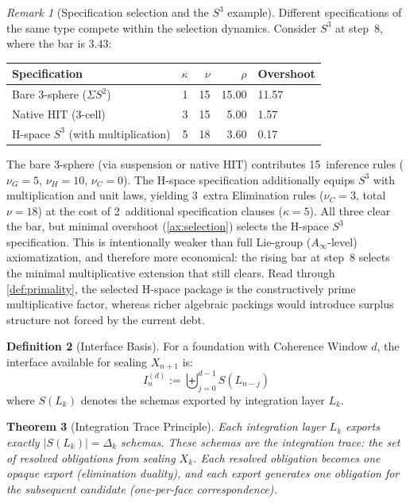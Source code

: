 \documentclass[11pt,a4paper]{article}
\theoremstyle{plain}
\newtheorem{theorem}{Theorem}[section]
\theoremstyle{definition}
\newtheorem{definition}[theorem]{Definition}
\theoremstyle{remark}
\newtheorem{remark}[theorem]{Remark}
\begin{document}
\begin{remark}[Specification selection and the $S^3$ example]
\label{rem:kolmogorov-ambiguity}
Different specifications of the same type compete within the selection dynamics.
Consider $S^3$ at step~8, where the bar is $3.43$:
\begin{center}
\small
\begin{tabular}{@{}lrrrl@{}}
\toprule
Specification & $\kappa$ & $\nu$ & $\rho$ & Overshoot \\
\midrule
Bare 3-sphere ($\Sigma S^2$) & 1 & 15 & 15.00 & 11.57 \\
Native HIT (3-cell)          & 3 & 15 &  5.00 &  1.57 \\
H-space $S^3$ (with multiplication)    & 5 & 18 &  3.60 &  0.17 \\
\bottomrule
\end{tabular}
\end{center}
The bare 3-sphere (via suspension or native HIT) contributes 15~inference rules ($\nu_G = 5$, $\nu_H = 10$, $\nu_C = 0$).
The H-space specification additionally equips $S^3$ with multiplication and unit laws, yielding 3~extra Elimination rules ($\nu_C = 3$, total $\nu = 18$) at the cost of 2~additional specification clauses ($\kappa = 5$).
All three clear the bar, but minimal overshoot (\cref{ax:selection}) selects the H-space $S^3$ specification.
This is intentionally weaker than full Lie-group ($A_\infty$-level) axiomatization, and therefore more economical: the rising bar at step~8 selects the minimal multiplicative extension that still clears.
Read through \cref{def:primality}, the selected H-space package is the constructively prime multiplicative factor, whereas richer algebraic packings would introduce surplus structure not forced by the current debt.
\end{remark}

\begin{definition}[Interface Basis]
\label{def:interface}
For a foundation with Coherence Window $d$, the interface available for sealing $X_{n+1}$ is:
\begin{equation}
    I^{(d)}_n := \biguplus_{j=0}^{d-1} S(L_{n-j})
\end{equation}
where $S(L_k)$ denotes the schemas exported by integration layer $L_k$.
\end{definition}

\begin{theorem}[Integration Trace Principle]
\label{lem:trace}
Each integration layer $L_k$ exports exactly $|S(L_k)| = \Delta_k$ schemas.
These schemas are the \emph{integration trace}: the set of resolved obligations from sealing $X_k$.
Each resolved obligation becomes one opaque export (\emph{elimination duality}), and each export generates one obligation for the subsequent candidate (\emph{one-per-face correspondence}).
\end{theorem}
\end{document}
